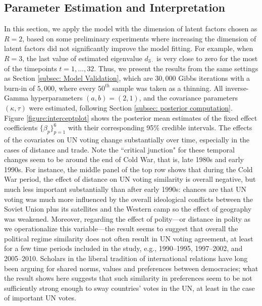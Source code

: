 \documentclass[a4paper]{article}
\begin{document}
\subsection{Parameter Estimation and Interpretation}\label{subsec: UNresult}
In this section, we apply the model with the dimension of latent factors chosen as $R=2$, based on some preliminary experiments where increasing the dimension of latent factors did not significantly improve the model fitting. For example, when $R=3$, the last value of estimated eigenvalue $d_{3\cdot}$ is very close to zero for the most of the timepoints $t=1,\ldots,32$. Thus, we present the results from the same settings as Section \ref{subsec: Model Validation}, which are $30,000$ Gibbs iterations with a burn-in of $5,000$, where every $50^{th}$ sample was taken as a thinning. All inverse-Gamma hyperparameters $(a, b) = (2, 1)$, and the covariance parameters $(\kappa, \tau)$ were estimated, following Section \ref{subsec: posterior computation}. \\ \newline
Figure \ref{figure:interceptplot} shows the posterior mean estimates of the fixed effect coefficients $\{\beta_p\}_{p=1}^6$ with their corresponding 95\% credible intervals. The effects of the covariates on UN voting change substantially over time, especially in the cases of distance and trade. Note the ``critical junction" for these temporal changes seem to be around the end of Cold War, that is, late 1980s and early 1990s. For instance, the middle panel of the top row shows that during the Cold War period, the effect of distance on UN voting similarity is overall negative, but much less important substantially than after early 1990s: chances are that UN voting was much more influenced by the overall ideological conflicts between the Soviet Union plus its satellites and the Western camp so the effect of geography was weakened. Moreover, regarding the effect of polity---or distance in polity as we operationalize this variable---the result seems to suggest that overall the political regime similarity does not often result in UN voting agreement, at least for a few time periods included in the study, e.g., 1990--1995, 1997--2002, and 2005--2010. Scholars in the liberal tradition of international relations have long been arguing for shared norms, values and preferences between democracies; what the result shows here suggests that such similarity in preferences seem to be not sufficiently strong enough to sway countries' votes in the UN, at least in the case of important UN votes.\\
\end{document}
